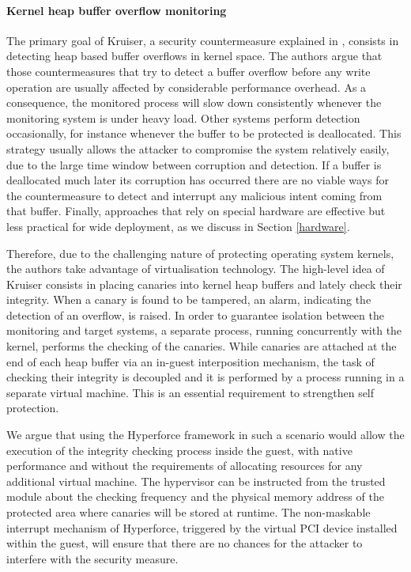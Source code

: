\paragraph{Kernel heap buffer overflow monitoring}
The primary goal of Kruiser, a security countermeasure explained in \cite{heapoverflow}, consists in detecting heap based buffer overflows in kernel space. The authors argue that those countermeasures that try to detect a buffer overflow before any write operation are usually affected by considerable performance overhead. As a consequence, the monitored process will slow down consistently whenever the monitoring system is under heavy load. Other systems perform detection occasionally, for instance whenever the buffer to be protected is deallocated. This strategy usually allows the attacker to compromise the system relatively easily, due to the large time window between corruption and detection. If a buffer is deallocated much later its corruption has occurred there are no viable ways for the countermeasure to detect and interrupt any malicious intent coming from that buffer. Finally, approaches that rely on special hardware are effective but less practical for wide deployment, as we discuss in Section \ref{hardware}.

Therefore, due to the challenging nature of protecting operating system kernels, the authors take advantage of virtualisation technology.  
The high-level idea of Kruiser consists in placing canaries into kernel heap buffers and lately check their integrity. When a canary is found to be tampered, an alarm, indicating the detection of an overflow, is raised.
In order to guarantee isolation between the monitoring and target systems, a separate process, running concurrently with the kernel, performs the checking of the canaries. 
While canaries are attached at the end of each heap buffer via an in-guest interposition mechanism, the task of  checking their integrity is decoupled and it is performed by a process running in a separate virtual machine.  
This is an essential requirement to strengthen self protection.

We argue that using the Hyperforce framework in such a scenario would allow the execution of the integrity checking process inside the guest, with native performance and without the requirements of allocating resources for any additional virtual machine. 
The hypervisor can be instructed from the trusted module about the checking frequency and the physical memory address of the protected area where canaries will be stored at runtime. The non-maskable interrupt mechanism of Hyperforce, triggered by the virtual PCI device installed within the guest, will ensure that there are no chances for the attacker to interfere with the security measure. 


